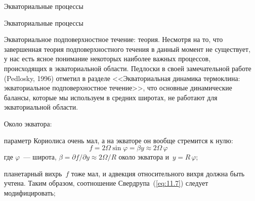 \begin{chapter}{Экваториальные процессы}
\begin{section}{Экваториальные процессы}
\begin{paragraph}{Экваториальное подповерхностное течение: теория.}
%
Несмотря на то, что завершенная теория подповерхностного течения в данный
момент не существует, у нас есть ясное
понимание некоторых наиболее важных процессов, происходящих в
экваториальной области. Педлоски в своей замечательной работе (Pedlosky, 1996)
отметил в разделе <<Экваториальная динамика термоклина: экваториальное 
подповерхностное течение>>, что основные динамические балансы, которые мы
используем в средних широтах, не работают для экваториальной области.
%

Около экватора:
\begin{enumparen}
\item
параметр Кориолиса очень мал, 
а на экваторе он вообще стремится к нулю:
\begin{equation}
 f=2\Omega \sin\varphi = \beta y \approx 2\Omega \,\varphi
\end{equation}
где $\varphi$~--- широта, $\beta = \partial f/\partial y \approx 2\Omega/R$ 
около экватора и~$y=R\,\varphi$;
%

\item
планетарный вихрь~$f$ тоже мал, и адвекция относительного
вихря должна быть учтена. Таким образом, соотношение Свердрупа~(\ref{eq:11.7}) 
следует модифицировать;
%


\end{enumparen}
\end{paragraph}
\end{section}
\end{chapter}
